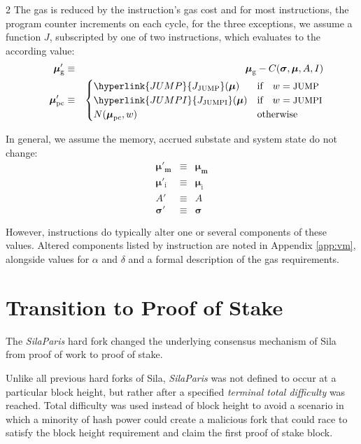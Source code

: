 \documentclass[9pt,oneside]{amsart}
\begin{document}
\begin{multicols}{2}
The gas is reduced by the instruction's gas cost and for most instructions, the program counter increments on each cycle, for the three exceptions, we assume a function $J$, subscripted by one of two instructions, which evaluates to the according value:
\begin{eqnarray}
\quad \boldsymbol{\mu}'_{\mathrm{g}} & \equiv & \boldsymbol{\mu}_{\mathrm{g}} - C(\boldsymbol{\sigma}, \boldsymbol{\mu}, A, I) \label{eq:mu_pc}\\
\quad \boldsymbol{\mu}'_{\mathrm{pc}} & \equiv & \begin{cases}
\hyperlink{JUMP}{J_{\text{JUMP}}}(\boldsymbol{\mu}) & \text{if} \quad w = \text{\small JUMP} \\
\hyperlink{JUMPI}{J_{\text{JUMPI}}}(\boldsymbol{\mu}) & \text{if} \quad w = \text{\small JUMPI} \\
N(\boldsymbol{\mu}_{\mathrm{pc}}, w) & \text{otherwise}
\end{cases}
\end{eqnarray}

In general, we assume the memory, accrued substate and system state do not change:
\begin{eqnarray}
\boldsymbol{\mu}'_{\mathbf{m}} & \equiv & \boldsymbol{\mu}_{\mathbf{m}} \\
\boldsymbol{\mu}'_{\mathrm{i}} & \equiv & \boldsymbol{\mu}_{\mathrm{i}} \\
A' & \equiv & A \\
\boldsymbol{\sigma}' & \equiv & \boldsymbol{\sigma}
\end{eqnarray}

However, instructions do typically alter one or several components of these values. Altered components listed by instruction are noted in Appendix \ref{app:vm}, alongside values for $\alpha$ and $\delta$ and a formal description of the gas requirements.

\section{Transition to Proof of Stake} \label{ch:pos_transition}
The \textit{SilaParis} hard fork changed the underlying consensus mechanism of Sila from proof of work to proof of stake.

Unlike all previous hard forks of Sila, \textit{SilaParis} was not defined to occur at a particular block height, but rather after a specified \textit{terminal total difficulty} was reached.
Total difficulty was used instead of block height to avoid a scenario in which a minority of hash power could create a malicious fork that could race to satisfy the block height requirement and claim the first proof of stake block.


\end{multicols}
\end{document}
